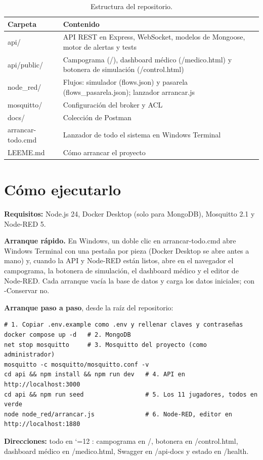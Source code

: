 \documentclass[runningheads]{llncs}
\renewcommand{\url}{\begingroup\catcode`\/=12 \urlconbarras}}
\newcommand{\urlconbarras}[1]{\urloriginal{#1}\endgroup}
\begin{document}
\begin{table}[!htbp]
\centering
\caption{Estructura del repositorio.}\label{tab:repo}
\footnotesize
\begin{tabularx}{\textwidth}{p{3.6cm}L}
\toprule
\textbf{Carpeta} & \textbf{Contenido} \\
\midrule
api/ & API REST en Express, WebSocket, modelos de Mongoose, motor de alertas y tests \\
api/public/ & Campograma (/), dashboard médico (/medico.html) y botonera de simulación (/control.html) \\
node\_red/ & Flujos: simulador (flows.json) y pasarela (flows\_pasarela.json); lanzador arrancar.js \\
mosquitto/ & Configuración del broker y ACL \\
docs/ & Colección de Postman \\
arrancar-todo.cmd & Lanzador de todo el sistema en Windows Terminal \\
LEEME.md & Cómo arrancar el proyecto \\
\bottomrule
\end{tabularx}
\end{table}

\section{Cómo ejecutarlo}

\textbf{Requisitos:} Node.js 24, Docker Desktop (solo para MongoDB), Mosquitto 2.1 y Node-RED 5.

\textbf{Arranque rápido.} En Windows, un doble clic en arrancar-todo.cmd abre Windows Terminal con una pestaña por pieza (Docker Desktop se abre antes a mano) y, cuando la API y Node-RED están listos, abre en el navegador el campograma, la botonera de simulación, el dashboard médico y el editor de Node-RED. Cada arranque vacía la base de datos y carga los datos iniciales; con -Conservar no.

\textbf{Arranque paso a paso}, desde la raíz del repositorio:

\begin{lstlisting}[language=shell]
# 1. Copiar .env.example como .env y rellenar claves y contraseñas
docker compose up -d   # 2. MongoDB
net stop mosquitto     # 3. Mosquitto del proyecto (como administrador)
mosquitto -c mosquitto/mosquitto.conf -v
cd api && npm install && npm run dev   # 4. API en http://localhost:3000
cd api && npm run seed                 # 5. Los 11 jugadores, todos en verde
node node_red/arrancar.js              # 6. Node-RED, editor en http://localhost:1880
\end{lstlisting}

\textbf{Direcciones:} todo en \url{http://localhost:3000}: campograma en /, botonera en /control.html, dashboard médico en /medico.html, Swagger en /api-docs y estado en /health.
\end{document}
